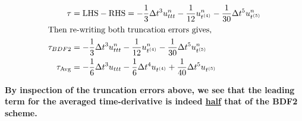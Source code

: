 \begin{enumerate}[label=\alph*., start = 3]
\begin{align*}
        \tau & = \text{LHS} - \text{RHS} = -\frac{1}{3}\Delta t^3u_{ttt}^n - \frac{1}{12}u_{t^{(4)}}^n - \frac{1}{30}\Delta t^5u_{t^{(5)}}^n\\
        \shortintertext{Then re-writing both truncation errors gives,}
        \tau_{BDF2} & = -\frac{1}{3}\Delta t^3u_{ttt}^n - \frac{1}{12}u_{t^{(4)}}^n - \frac{1}{30}\Delta t^5u_{t^{(5)}}^n\\
        \tau_{\text{Avg}} & = -\frac{1}{6}\Delta t^3u_{ttt} - \frac{1}{6}\Delta t^4u_{t^{(4)}} + \frac{1}{40}\Delta t^5u_{t^{(5)}}
    \end{align*}

    \begin{fminipage}{0.9\linewidth}
        \textbf{By inspection of the truncation errors above, we see that the leading term for the averaged time-derivative is indeed \underline{half} that of the BDF2 scheme.}
    \end{fminipage}

\end{enumerate}
